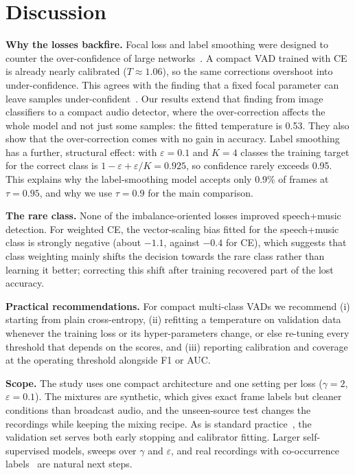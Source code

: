 \documentclass[conference]{IEEEtran}
\newcommand{\spmu}{speech+music}
\begin{document}
\section{Discussion}\label{sec:discussion}

\textbf{Why the losses backfire.} Focal loss and label smoothing were designed to counter the over-confidence of large networks~\cite{mukhoti2020focal,muller2019labelsmoothing}. A compact VAD trained with CE is already nearly calibrated ($T\approx1.06$), so the same corrections overshoot into under-confidence. This agrees with the finding that a fixed focal parameter can leave samples under-confident~\cite{ghosh2022adafocal}. Our results extend that finding from image classifiers to a compact audio detector, where the over-correction affects the whole model and not just some samples: the fitted temperature is 0.53. They also show that the over-correction comes with no gain in accuracy. Label smoothing has a further, structural effect: with $\varepsilon=0.1$ and $K=4$ classes the training target for the correct class is $1-\varepsilon+\varepsilon/K=0.925$, so confidence rarely exceeds 0.95. This explains why the label-smoothing model accepts only 0.9\% of frames at $\tau=0.95$, and why we use $\tau=0.9$ for the main comparison.

\textbf{The rare class.} None of the imbalance-oriented losses improved \spmu{} detection. For weighted CE, the vector-scaling bias fitted for the \spmu{} class is strongly negative (about $-1.1$, against $-0.4$ for CE), which suggests that class weighting mainly shifts the decision towards the rare class rather than learning it better; correcting this shift after training recovered part of the lost accuracy.

\textbf{Practical recommendations.} For compact multi-class VADs we recommend (i) starting from plain cross-entropy, (ii) refitting a temperature on validation data whenever the training loss or its hyper-parameters change, or else re-tuning every threshold that depends on the scores, and (iii) reporting calibration and coverage at the operating threshold alongside F1 or AUC.

\textbf{Scope.} The study uses one compact architecture and one setting per loss ($\gamma=2$, $\varepsilon=0.1$). The mixtures are synthetic, which gives exact frame labels but cleaner conditions than broadcast audio, and the unseen-source test changes the recordings while keeping the mixing recipe. As is standard practice~\cite{guo2017calibration}, the validation set serves both early stopping and calibrator fitting. Larger self-supervised models, sweeps over $\gamma$ and $\varepsilon$, and real recordings with co-occurrence labels~\cite{hung2021avaspeechsmad} are natural next steps.
\end{document}
